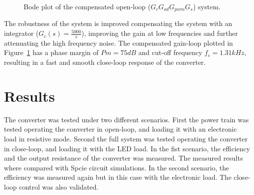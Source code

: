 \begin{figure}[!h]
    \newcommand\pHeigh{3cm}
    \newcommand\pWidth{8cm}
    \centering
    
    \caption[]{Bode plot of the compensated open-loop ($G_{c}G_{od}G_{pwm}G_s$) system.}
    \label{fig:ol_cm_bode}
\end{figure}

The robustness of the system is improved compensating the system with an integrator ($G_c(s) = \frac{5000}{s}$), improving the gain at low frequencies and further attenuating the high frequency noise. The compensated gain-loop plotted in Figure~\ref{fig:ol_cm_bode} has a phase margin of $Pm = 75dB$ and cut-off frequency $f_{c} =1.31kHz$, resulting in a fast and smooth close-loop response of the converter.

\section{Results}
The converter was tested under two different scenarios. First the power train was tested operating the converter in open-loop, and loading it with an electronic load in resistive mode. Second the full system was tested operating the converter in close-loop, and loading it with the LED load. In the fist scenario, the efficiency and the output resistance of the converter was measured. The measured results where compared with Spcie circuit simulations.  In the second scenario, the efficiency was measured again but in this case with the electronic load. The close-loop control was also validated.

